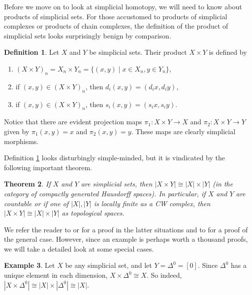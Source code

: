 \documentclass[12pt]{article}
\theoremstyle{plain}
\newtheorem{theorem}{Theorem}[section]
\theoremstyle{definition}
\newtheorem{definition}[theorem]{Definition}
\newtheorem{example}[theorem]{Example}
\begin{document}
Before we move on to  look at simplicial homotopy, we will need to know about products of simplicial sets. For those accustomed to products of simplicial complexes or products of chain complexes, the definition of the product of simplicial sets looks surprisingly benign by comparison.

\begin{definition}\label{D: product}
Let $X$ and $Y$ be simplicial sets. Their product $X\times Y$ is defined by 
\begin{enumerate}
\item $(X\times Y)_n=X_n\times Y_n=\{ (x,y)\mid x\in X_n, y\in Y_n\}$,

\item if $(x,y)\in (X\times Y)_n$, then $d_i(x,y)=(d_ix,d_iy)$,

\item if $(x,y)\in (X\times Y)_n$, then $s_i(x,y)=(s_ix,s_iy)$.
\end{enumerate}
\end{definition}

Notice that there are evident projection maps $\pi_1\colon X\times Y\to X$ and $\pi_2\colon X\times Y\to Y$ given by $\pi_1(x,y)=x$ and $\pi_2(x,y)=y$. These maps are clearly simplicial morphisms.

Definition \ref{D: product} looks disturbingly simple-minded, but it is vindicated by the following important theorem.

\begin{theorem}\label{T: product}
If $X$ and $Y$ are simplicial sets, then $|X\times Y|\cong |X|\times |Y|$ (in the category of compactly generated Hausdorff spaces). In particular, if $X$ and $Y$ are countable or if one of $|X|,|Y|$ is locally finite as a CW complex, then $|X\times Y|\cong |X|\times |Y|$ as topological spaces.
\end{theorem}
We refer the reader to \cite[Theorem 14.3]{MAY67} or \cite{Mi57} for a proof in the latter situations and to \cite[Chapter III]{GabZis} for a proof of the general case. However, since an example is perhaps worth a thousand proofs, we will take a detailed look at some special cases. 



\begin{example}
Let $X$ be any simplicial set, and let $Y=\Delta^0=[0]$. Since $\Delta^0$ has a unique element in each dimension, $X\times \Delta^0\cong X$. So indeed, $|X\times \Delta^0|\cong |X|\times |\Delta^0|\cong  |X|$. 
\end{example}
\end{document}
